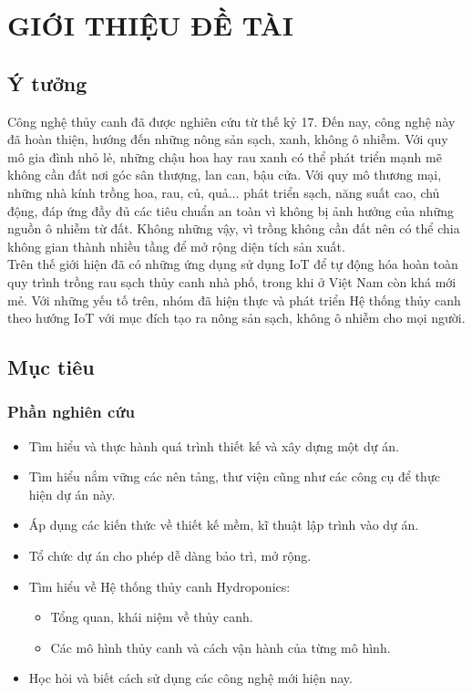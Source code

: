 \documentclass[a4paper,12pt,oneside]{article}
\begin{document}
\newpage
{}
\section{GIỚI THIỆU ĐỀ TÀI}

\subsection{Ý tưởng}

\noindent Công nghệ thủy canh đã được nghiên cứu từ thế kỷ 17. Đến nay, công nghệ này đã hoàn thiện, hướng đến những nông sản sạch, xanh, không ô nhiễm. Với quy mô gia đình nhỏ lẻ, những chậu hoa hay rau xanh có thể phát triển mạnh mẽ không cần đất nơi góc sân thượng, lan can, bậu cửa. Với quy mô thương mại, những nhà kính trồng hoa, rau, củ, quả...  phát triển sạch, năng suất cao, chủ động, đáp ứng đầy đủ các tiêu chuẩn an toàn vì không bị ảnh hưởng của những nguồn ô nhiễm từ đất. Không những vậy, vì trồng không cần đất nên có thể chia không gian thành nhiều tầng để mở rộng diện tích sản xuất.\\

\noindent Trên thế giới hiện đã có những ứng dụng sử dụng IoT để tự động hóa hoàn toàn quy trình trồng rau sạch thủy canh nhà phố, trong khi ở Việt Nam còn khá mới mẻ. Với những yếu tố trên, nhóm đã hiện thực và phát triển Hệ thống thủy canh theo hướng IoT với mục đích tạo ra nông sản sạch, không ô nhiễm cho mọi người.


\subsection{Mục tiêu}
\subsubsection{Phần nghiên cứu}
\begin{itemize}
\item Tìm hiểu và thực hành quá trình thiết kế và xây dựng một dự án.
\item Tìm hiểu nắm vững các nên tảng, thư viện cũng như các công cụ để thực hiện dự án này.
\item Áp dụng các kiến thức về thiết kế mềm, kĩ thuật lập trình vào dự án.
\item Tổ chức dự án cho phép dễ dàng bảo trì, mở rộng.
\item Tìm hiểu về Hệ thống thủy canh Hydroponics: 
	\begin{itemize}
	\item Tổng quan, khái niệm về thủy canh.
	\item Các mô hình thủy canh và cách vận hành của từng mô hình.
	\end{itemize}
\item Học hỏi và biết cách sử dụng các công nghệ mới hiện nay.
\end{itemize}
\end{document}
